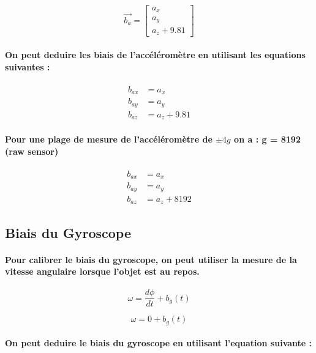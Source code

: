 \begin{equation}
	\vec{b_a} = \begin{bmatrix}
		a_x \\
		a_y \\
		a_z + 9.81
	\end{bmatrix}
\end{equation}


\paragraph{On peut deduire les biais de l'accéléromètre en utilisant les equations suivantes :}

\begin{align}
	b_{ax} &= a_x \\
	b_{ay} &= a_y \\
	b_{az} &= a_z + 9.81
\end{align}

\paragraph{Pour une plage de mesure de l'accéléromètre de $\pm 4g$ on a : g = 8192 (raw sensor)}

\begin{align}
	b_{ax} &= a_x \\
	b_{ay} &= a_y \\
	b_{az} &= a_z + 8192
\end{align}


\subsection{Biais du Gyroscope}

\paragraph{Pour calibrer le biais du gyroscope, on peut utiliser la mesure de la vitesse angulaire lorsque l'objet est au repos.}

\begin{equation}
	\omega = \frac{d\phi}{dt} + b_g(t)
\end{equation}

\begin{equation}
	\omega = 0 + b_g(t)
\end{equation}

\paragraph{On peut deduire le biais du gyroscope en utilisant l'equation suivante :}

